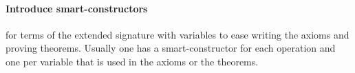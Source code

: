\begin{code}
\AgdaOperator{\AgdaFunction{[}}\AgdaSpace{}%
\AgdaSpace{}%
\AgdaOperator{\AgdaFunction{]}}\AgdaSymbol{)}\AgdaSpace{}%
\AgdaSpace{}%
\AgdaSymbol{)}\<%
\\
%
\\[\AgdaEmptyExtraSkip]%
\>[0]\AgdaSpace{}%
\AgdaSymbol{:}\AgdaSpace{}%
\<%
\\
\>[0]\AgdaSpace{}%
\AgdaSymbol{=}\AgdaSpace{}%
\AgdaSpace{}%
\AgdaSymbol{\{}\AgdaSpace{}%
\AgdaSpace{}%
\AgdaSymbol{=}\AgdaSpace{}%
\AgdaSpace{}%
\AgdaSymbol{;}\AgdaSpace{}%
\AgdaSpace{}%
\AgdaSymbol{=}\AgdaSpace{}%
\AgdaSpace{}%
\AgdaSymbol{\}}\<%
\\
%
\\[\AgdaEmptyExtraSkip]%
%
\>[0]\AgdaSpace{}%
\AgdaSymbol{:}\AgdaSpace{}%
\AgdaSpace{}%
\<%
\\
%
\>[0]\AgdaSpace{}%
\AgdaSpace{}%
\AgdaSymbol{=}\AgdaSpace{}%
\<%
\\
%
\\[\AgdaEmptyExtraSkip]%
%
\>[0]\AgdaSpace{}%
\AgdaSymbol{:}\AgdaSpace{}%
\<%
\\
%
\>[0]\AgdaSpace{}%
\AgdaSymbol{=}\AgdaSpace{}%
\AgdaSpace{}%
\AgdaSpace{}%
\AgdaSpace{}%
\<%
\\
\end{code}
  
\paragraph*{Introduce smart-constructors}
\label{sec:intr-smart-constr}
  for terms of the extended
  signature with variables to ease writing the axioms and proving
  theorems. Usually one has a smart-constructor for each operation and
  one per variable that is used in the axioms or the theorems.

